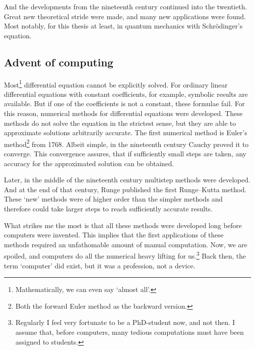 And the developments from the nineteenth century continued into the twentieth. Great new theoretical stride were made, and many new applications were found. Most notably, for this thesis at least, in quantum mechanics with Schrödinger's equation.

\subsection{Advent of computing}

Most\footnote{Mathematically, we can even say `almost all'.} differential equation cannot be explicitly solved. For ordinary linear differential equations with constant coefficients, for example, symbolic results are available. But if one of the coefficients is not a constant, these formulae fail. For this reason, numerical methods for differential equations were developed. These methods do not solve the equation in the strictest sense, but they are able to approximate solutions arbitrarily accurate. The first numerical method is Euler's method\footnote{Both the forward Euler method as the backward version.} from 1768. Albeit simple, in the nineteenth century Cauchy proved it to converge. This convergence assures, that if sufficiently small steps are taken, any accuracy for the approximated solution can be obtained.

Later, in the middle of the nineteenth century multistep methods were developed. And at the end of that century, Runge published the first Runge--Kutta method. These `new' methods were of higher order than the simpler methods and therefore could take larger steps to reach sufficiently accurate results.

What strikes me the most is that all these methods were developed long before computers were invented. This implies that the first applications of these methods required an unfathomable amount of manual computation. Now, we are spoiled, and computers do all the numerical heavy lifting for us.\footnote{Regularly I feel very fortunate to be a PhD-student now, and not then. I assume that, before computers, many tedious computations must have been assigned to students.} Back then, the term `computer' did exist, but it was a profession, not a device.

